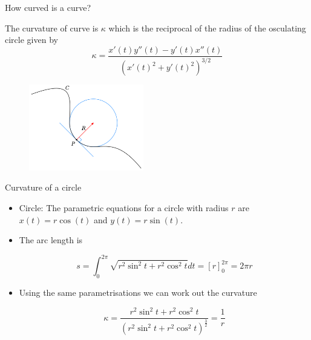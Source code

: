 \documentclass{beamer}
\begin{document}
\begin{frame}{How curved is a curve?}
	\begin{Theorem}[Curvature]
		The curvature of curve is $\kappa$ which is the reciprocal of the radius of the osculating circle given by
		\[
		\kappa=\frac{x'(t) y''(t) - y'(t) x''(t)}{\left( x'(t)^2 + y'(t)^2 \right)^{3/2}}
		\]
	\end{Theorem}
	\begin{figure}
	\centering
	\includegraphics[width=50mm, scale=0.4]{Curvature_circle.png}
\end{figure}
\end{frame}

\begin{frame}{Curvature of a circle}
	\begin{itemize}	
		
		\item Circle: The parametric equations for a circle with radius $r$ are $x(t)=r \cos(t)$ and $y(t)= r \sin(t)$. 
		\item The arc length is 
		
		\[	
		s = \int_{0}^{2 \pi} \sqrt{r^2 \sin^2 t + r^2 \cos^2 t}dt = \left[r \right]_{0}^{2 \pi} = 2 \pi r
		\]
	
		\item Using the same parametrisations we can work out the curvature
		
		\[
		\kappa = \frac{r^2 \sin^2 t + r^2 \cos^2 t}{\left(r^2 \sin^2 t + r^2 \cos^2 t \right) ^ \frac{3}{2}} = \frac{1}{r}
		\]
		
	\end{itemize}
\end{frame}
\end{document}
